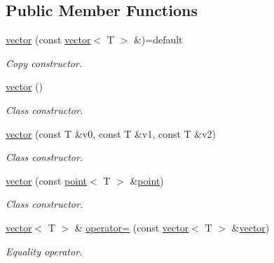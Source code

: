 \subsection*{Public Member Functions}
\begin{DoxyCompactItemize}
\item 
\mbox{\label{classddd_1_1vector_a9e10641f3e361c24f5a9756bbd1b2d44}} 
\hyperlink{classddd_1_1vector_a9e10641f3e361c24f5a9756bbd1b2d44}{vector} (const \hyperlink{classddd_1_1vector}{vector}$<$ T $>$ \&)=default
\begin{DoxyCompactList}\small\item\em Copy constructor. \end{DoxyCompactList}\item 
\mbox{\label{classddd_1_1vector_a5231808b18bae0590e5083ff27b29056}} 
\hyperlink{classddd_1_1vector_a5231808b18bae0590e5083ff27b29056}{vector} ()
\begin{DoxyCompactList}\small\item\em Class constructor. \end{DoxyCompactList}\item 
\hyperlink{classddd_1_1vector_a8339300bbb7433f4988b2aebeef90599}{vector} (const T \&v0, const T \&v1, const T \&v2)
\begin{DoxyCompactList}\small\item\em Class constructor. \end{DoxyCompactList}\item 
\hyperlink{classddd_1_1vector_a0ac6eee190f95425480a001947644fa4}{vector} (const \hyperlink{classddd_1_1point}{point}$<$ T $>$ \&\hyperlink{classddd_1_1point}{point})
\begin{DoxyCompactList}\small\item\em Class constructor. \end{DoxyCompactList}\item 
\hyperlink{classddd_1_1vector}{vector}$<$ T $>$ \& \hyperlink{classddd_1_1vector_a873d3b0fd4d4a5d7a1b6a9d7e907009d}{operator=} (const \hyperlink{classddd_1_1vector}{vector}$<$ T $>$ \&\hyperlink{classddd_1_1vector}{vector})
\begin{DoxyCompactList}\small\item\em Equality operator. \end{DoxyCompactList}\item 
\mbox{\label{classddd_1_1vector_aeff69a088496a7c9295b30b1c928df70}} 

\end{DoxyCompactItemize}
